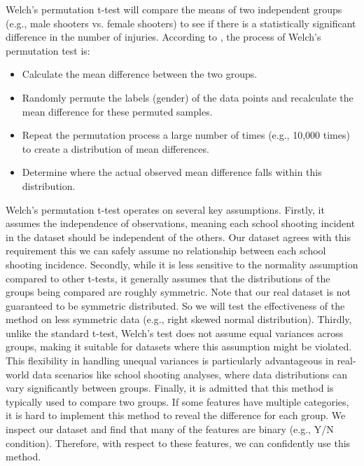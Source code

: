 \documentclass[12pt]{article}
\numberwithin{figure}{section}
\begin{document}
Welch's permutation t-test will compare the means of two independent groups (e.g., male shooters vs. female shooters) to see if there is a statistically significant difference in the number of injuries. According to \textcite{slides_perm}, the process of Welch's permutation test is:

\begin{itemize}
    \item Calculate the mean difference between the two groups.
    \item Randomly permute the labels (gender) of the data points and recalculate the mean difference for these permuted samples.
    \item Repeat the permutation process a large number of times (e.g., 10,000 times) to create a distribution of mean differences.
    \item Determine where the actual observed mean difference falls within this distribution.
\end{itemize}

Welch's permutation t-test operates on several key assumptions. Firstly, it assumes the independence of observations, meaning each school shooting incident in the dataset should be independent of the others. Our dataset agrees with this requirement this we can safely assume no relationship between each school shooting incidence. Secondly, while it is less sensitive to the normality assumption compared to other t-tests, it generally assumes that the distributions of the groups being compared are roughly symmetric. Note that our real dataset is not guaranteed to be symmetric distributed. So we will test the effectiveness of the method on less symmetric data (e.g., right skewed normal distribution). Thirdly, unlike the standard t-test, Welch's test does not assume equal variances across groups, making it suitable for datasets where this assumption might be violated. This flexibility in handling unequal variances is particularly advantageous in real-world data scenarios like school shooting analyses, where data distributions can vary significantly between groups. Finally, it is admitted that this method is typically used to compare two groups. If some features have multiple categories, it is hard to implement this method to reveal the difference for each group. We inspect our dataset and find that many of the features are binary (e.g., Y/N condition). Therefore, with respect to these features, we can confidently use this method.
\end{document}
